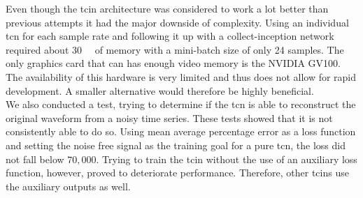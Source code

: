 Even though the \gls{tcin} architecture was considered to work a lot better than previous attempts it had the major downside of complexity. Using an individual \gls{tcn} for each sample rate and following it up with a collect-inception network required about \SI{30}{\giga\byte} of memory with a mini-batch size of only 24 samples. The only graphics card that can has enough video memory is the NVIDIA GV100. The availability of this hardware is very limited and thus does not allow for rapid development. A smaller alternative would therefore be highly beneficial.\\
We also conducted a test, trying to determine if the \gls{tcn} is able to reconstruct the original waveform from a noisy time series. These tests showed that it is not consistently able to do so. Using mean average percentage error as a loss function and setting the noise free signal as the training goal for a pure \gls{tcn}, the loss did not fall below $70,000$. Trying to train the \gls{tcin} without the use of an auxiliary loss function, however, proved to deteriorate performance. Therefore, other \gls{tcin}s use the auxiliary outputs as well.
